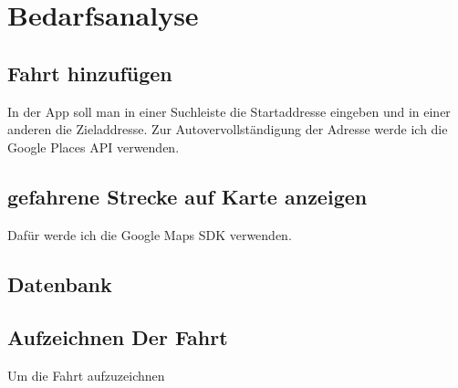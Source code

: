 \documentclass[a4paper]{article}
\begin{document}


\section{Bedarfsanalyse}

\subsection{Fahrt hinzufügen}
In der App soll man in einer Suchleiste die Startaddresse eingeben und in einer anderen die Zieladdresse.
Zur Autovervollständigung der Adresse werde ich die Google Places API verwenden.

\subsection{gefahrene Strecke auf Karte anzeigen}
Dafür werde ich die Google Maps SDK verwenden.

\subsection{Datenbank}

%

\subsection{Aufzeichnen Der Fahrt}
Um die Fahrt aufzuzeichnen
\end{document}
